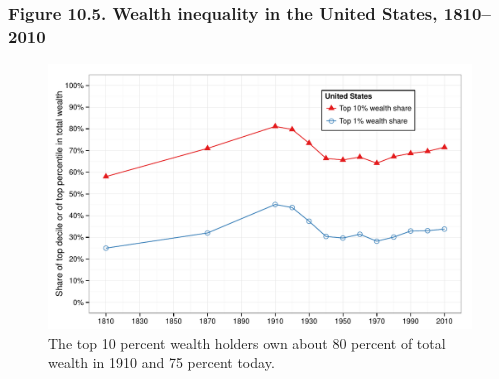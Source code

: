 \documentclass[t]{beamer}\usepackage[]{graphicx}\usepackage[]{color}
\newenvironment{knitrout}{}{} %
\begin{document}
\begin{frame}[label=Figure_10_5]
\frametitle{Figure 10.5. Wealth inequality in the United States, 1810--2010}
\begin{figure}[t]
\begin{minipage}[b]{\textwidth}
\centering
\begin{knitrout}\footnotesize
{}\color{fgcolor}

{\centering \includegraphics[width=1\linewidth]{figures/color/Figure_10_5} 

}



\end{knitrout}
\caption{The top 10 percent wealth holders own about 80 percent of total wealth in 1910 and 75 percent today.}
\end{minipage}
\end{figure}
\end{frame}
\end{document}
